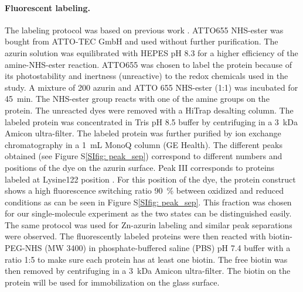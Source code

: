 \paragraph*{Fluorescent labeling.}
The labeling protocol was based on previous work \cite{nicolardi2012topdown}.
ATTO655 NHS-ester was bought from ATTO-TEC GmbH and used without further purification.
The azurin solution was equilibrated with HEPES pH 8.3 for a higher efficiency of the amine-NHS-ester reaction.
ATTO655 was chosen to label the protein because of its photostability and inertness (unreactive) to the redox chemicals used in the study.
A mixture of \SI{200}{\uM} azurin and ATTO 655 NHS-ester (1:1) was incubated for \SI{45}{\minute}.
The NHS-ester group reacts with one of the amine groups on the protein.
The unreacted dyes were removed with a HiTrap desalting column.
The labeled protein was concentrated in Tris pH 8.5 buffer by centrifuging in a \SI{3}{ kDa} Amicon ultra-filter.
The labeled protein was further purified by ion exchange chromatography in a \SI{1}{\mL} MonoQ column (GE Health).
The different peaks obtained (see Figure S\ref{SIfig: peak_sep}) correspond to different numbers and positions of the dye on the azurin surface. 
Peak III corresponds to proteins labeled at Lysine122 position \cite{nicolardi2012topdown}.
For this position of the dye, the protein construct shows a high fluorescence switching ratio \SI{90}{\percent} between oxidized and reduced conditions as can be seen in Figure S\ref{SIfig: peak_sep}. This fraction was chosen for our single-molecule experiment as the two states can be distinguished easily.
The same protocol was used for Zn-azurin labeling and similar peak separations were observed.
The fluorescently labeled proteins were then reacted with biotin-PEG-NHS (MW 3400) in phosphate-buffered saline (PBS) pH 7.4 buffer with a ratio 1:5 to make sure each protein has at least one biotin.
The free biotin was then removed by centrifuging in a \SI{3}{ kDa} Amicon ultra-filter.
The biotin on the protein will be used for immobilization on the glass surface.

